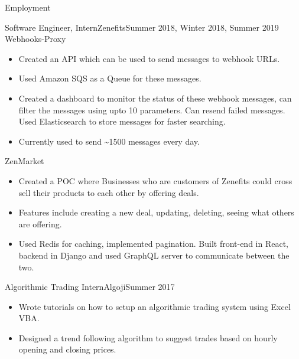 \documentclass[]{mcdowellcv}
\begin{document}
	\makeheader
	
	\vspace*{5mm}
	\begin{cvsection}{Employment}
\vspace*{2mm}
		\begin{cvsubsection}{Software Engineer, Intern}{Zenefits}{Summer 2018, Winter 2018, Summer 2019}
			Webhooks-Proxy
			\begin{itemize}
				\item Created an API which can be used to send messages to webhook URLs.
				\item Used Amazon SQS as a Queue for these messages.
				\item Created a dashboard to monitor the status of these webhook messages, can filter the messages using upto 10 parameters. Can resend failed messages. Used Elasticsearch to store messages for faster searching.
				\item  Currently used to send \textasciitilde1500 messages every day.
			\end{itemize}
			\vspace*{2mm}
			ZenMarket
			\begin{itemize}
				\item Created a POC where Businesses who are customers of Zenefits could cross sell their products to each other by offering deals.
				\item Features include creating a new deal, updating, deleting, seeing what others are offering.
				\item Used Redis for caching, implemented pagination. Built front-end in React, backend in Django and used GraphQL server to communicate between the two.
			 \end{itemize}
		\end{cvsubsection}
		\vspace*{3mm}
		\begin{cvsubsection}{Algorithmic Trading Intern}{Algoji}{Summer 2017}
			\begin{itemize}
				\item Wrote tutorials on how to setup an algorithmic trading system using Excel VBA.
				\item Designed a trend following algorithm to suggest trades based on hourly opening and closing prices.
			\end{itemize}
		\end{cvsubsection}
	\end{cvsection}
	\vspace*{5mm}
\end{document}
